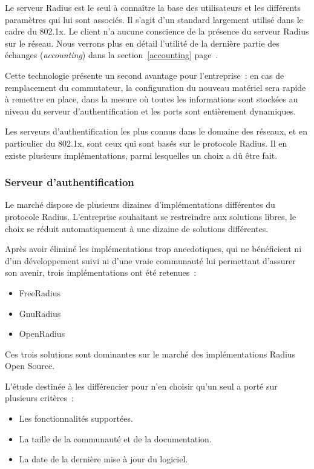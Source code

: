 Le serveur Radius est le seul à connaître la base des utilisateurs et les différents paramètres qui lui sont associés. Il s'agit d'un standard largement utilisé dans le cadre du 802.1x. Le client n'a aucune conscience de la présence du serveur Radius sur le réseau. Nous verrons plus en détail l'utilité de la dernière partie des échanges (\emph{accounting}) dans la section~\ref{accounting} page~\pageref{accounting}.

Cette technologie présente un second avantage pour l'entreprise~: en cas de remplacement du commutateur, la configuration du nouveau matériel sera rapide à remettre en place, dans la mesure où toutes les informations sont stockées au niveau du serveur d'authentification et les ports sont entièrement dynamiques.

Les serveurs d'authentification les plus connus dans le domaine des réseaux, et en particulier du 802.1x, sont ceux qui sont basés sur le protocole Radius. Il en existe plusieurs implémentations, parmi lesquelles un choix a dû être fait.

\subsubsection{Serveur d'authentification}

Le marché dispose de plusieurs dizaines d'implémentations différentes du protocole Radius. L'entreprise souhaitant se restreindre aux solutions libres, le choix se réduit automatiquement à une dizaine de solutions différentes.

Après avoir éliminé les implémentations trop anecdotiques, qui ne bénéficient ni d'un développement suivi ni d'une vraie communauté lui permettant d'assurer son avenir, trois implémentations ont été retenues~:

\begin{itemize}
\item FreeRadius
\item GnuRadius
\item OpenRadius
\end{itemize}

Ces trois solutions sont dominantes sur le marché des implémentations Radius Open Source.

L'étude destinée à les différencier pour n'en choisir qu'un seul a porté sur plusieurs critères~:

\begin{itemize}
\item Les fonctionnalités supportées.
\item La taille de la communauté et de la documentation.
\item La date de la dernière mise à jour du logiciel.
\end{itemize}

